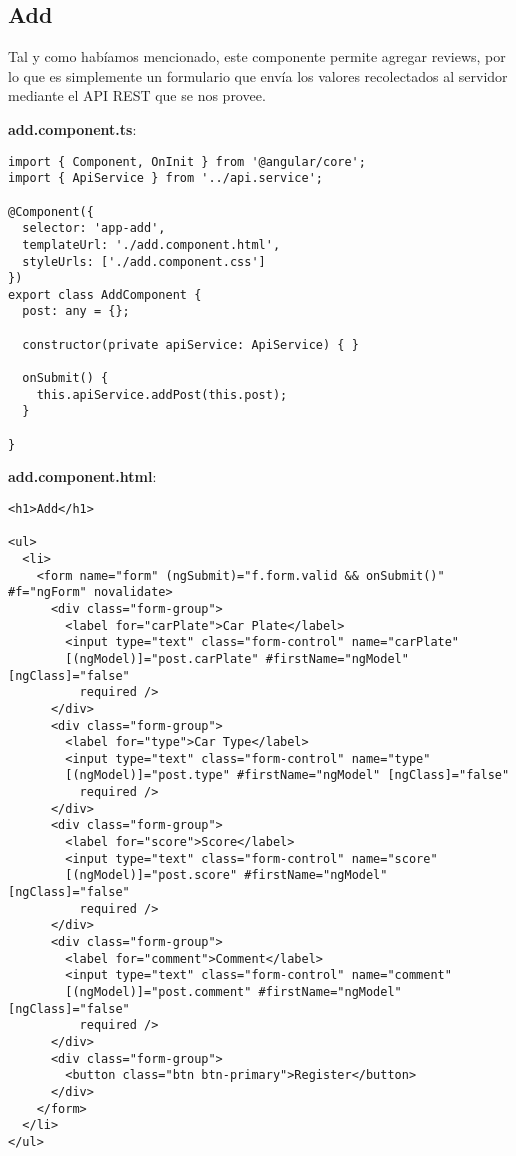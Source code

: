 \documentclass{article}
\begin{document}
\subsection{Add}
Tal y como hab\'iamos mencionado, este componente permite agregar reviews, por lo que es simplemente un formulario que env\'ia los valores recolectados al servidor mediante el API REST que se nos provee.

\vspace{0.5cm}
\textbf{add.component.ts}:
\begin{verbatim}
import { Component, OnInit } from '@angular/core';
import { ApiService } from '../api.service';

@Component({
  selector: 'app-add',
  templateUrl: './add.component.html',
  styleUrls: ['./add.component.css']
})
export class AddComponent {
  post: any = {};

  constructor(private apiService: ApiService) { }

  onSubmit() {
    this.apiService.addPost(this.post);
  }

}
\end{verbatim}

\vspace{0.5cm}
\textbf{add.component.html}:
\begin{verbatim}
<h1>Add</h1>

<ul>
  <li>
    <form name="form" (ngSubmit)="f.form.valid && onSubmit()" #f="ngForm" novalidate>
      <div class="form-group">
        <label for="carPlate">Car Plate</label>
        <input type="text" class="form-control" name="carPlate" 
        [(ngModel)]="post.carPlate" #firstName="ngModel" [ngClass]="false"
          required />
      </div>
      <div class="form-group">
        <label for="type">Car Type</label>
        <input type="text" class="form-control" name="type" 
        [(ngModel)]="post.type" #firstName="ngModel" [ngClass]="false"
          required />
      </div>
      <div class="form-group">
        <label for="score">Score</label>
        <input type="text" class="form-control" name="score" 
        [(ngModel)]="post.score" #firstName="ngModel" [ngClass]="false"
          required />
      </div>
      <div class="form-group">
        <label for="comment">Comment</label>
        <input type="text" class="form-control" name="comment" 
        [(ngModel)]="post.comment" #firstName="ngModel" [ngClass]="false"
          required />
      </div>
      <div class="form-group">
        <button class="btn btn-primary">Register</button>
      </div>
    </form>
  </li>
</ul>
\end{verbatim}
\end{document}
